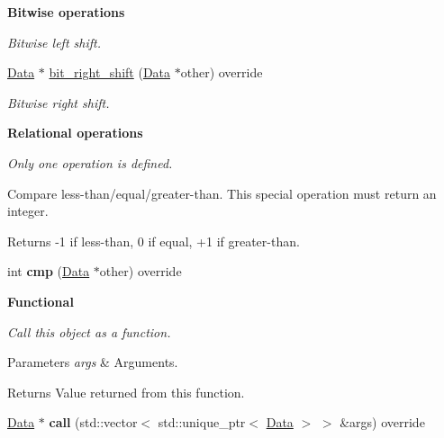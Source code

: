 \begin{Indent}{\bf Bitwise operations}
\begin{DoxyCompactItemize}
\begin{DoxyCompactList}\small\item\em Bitwise left shift. \end{DoxyCompactList}\item 
\hyperlink{classcreek_1_1_data}{Data} $\ast$ \hyperlink{classcreek_1_1_object_a22b91158c72ea301e72c9ed4f6afee3f}{bit\+\_\+right\+\_\+shift} (\hyperlink{classcreek_1_1_data}{Data} $\ast$other) override\hypertarget{classcreek_1_1_object_a22b91158c72ea301e72c9ed4f6afee3f}{}\label{classcreek_1_1_object_a22b91158c72ea301e72c9ed4f6afee3f}

\begin{DoxyCompactList}\small\item\em Bitwise right shift. \end{DoxyCompactList}\end{DoxyCompactItemize}
\end{Indent}
\begin{Indent}{\bf Relational operations}\par
{\em Only one operation is defined.

Compare less-\/than/equal/greater-\/than. This special operation must return an integer. \begin{DoxyReturn}{Returns}
-\/1 if less-\/than, 0 if equal, +1 if greater-\/than. 
\end{DoxyReturn}
}\begin{DoxyCompactItemize}
\item 
int {\bfseries cmp} (\hyperlink{classcreek_1_1_data}{Data} $\ast$other) override\hypertarget{classcreek_1_1_object_add90844b494e1057314cd3f1c748d070}{}\label{classcreek_1_1_object_add90844b494e1057314cd3f1c748d070}

\end{DoxyCompactItemize}
\end{Indent}
\begin{Indent}{\bf Functional}\par
{\em Call this object as a function. 
\begin{DoxyParams}{Parameters}
{\em args} & Arguments. \\
\hline
\end{DoxyParams}
\begin{DoxyReturn}{Returns}
Value returned from this function. 
\end{DoxyReturn}
}\begin{DoxyCompactItemize}
\item 
\hyperlink{classcreek_1_1_data}{Data} $\ast$ {\bfseries call} (std\+::vector$<$ std\+::unique\+\_\+ptr$<$ \hyperlink{classcreek_1_1_data}{Data} $>$ $>$ \&args) override\hypertarget{classcreek_1_1_object_afd8a80f8efe5343649fe872fe0c8a7c7}{}\label{classcreek_1_1_object_afd8a80f8efe5343649fe872fe0c8a7c7}

\end{DoxyCompactItemize}
\end{Indent}

